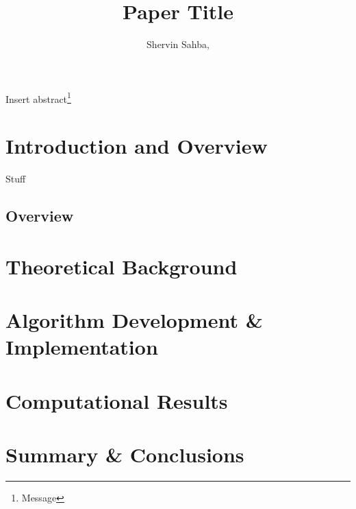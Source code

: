 \documentclass{shervin_article} %
\begin{document}
\title{Paper Title}

\author{Shervin Sahba,}
\address{Department of Physics, University of Washington, Seattle, WA 98105, USA.}



\begin{abstract*}
Insert abstract\footnote{Message}
\end{abstract*}


\section{Introduction and Overview}

Stuff\cite{J.NathanKutz130}

\subsection{Overview}

\medskip
\section{Theoretical Background} \label{sec:Background}

\medskip
\section{Algorithm Development \& Implementation} \label{sec:Methods}

\medskip{}
\section{Computational Results} \label{sec:Results}

\medskip
\section{Summary \& Conclusions} \label{sec:Conclusion}
\end{document}
